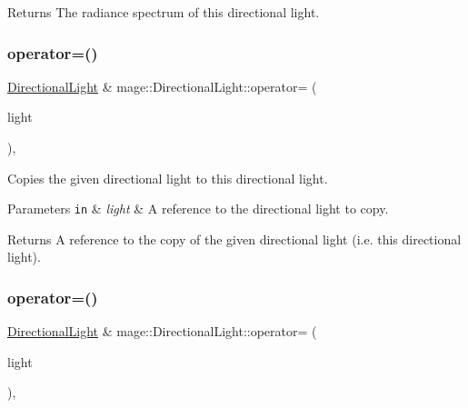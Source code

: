 \begin{DoxyReturn}{Returns}
The radiance spectrum of this directional light. 
\end{DoxyReturn}
\hypertarget{classmage_1_1_directional_light_acf66f214974d9fb60844c16e02c49b22}{}\label{classmage_1_1_directional_light_acf66f214974d9fb60844c16e02c49b22} 
\subsubsection{\texorpdfstring{operator=()}{operator=()}\hspace{0.1cm}{\footnotesize\ttfamily [1/2]}}
{\footnotesize\ttfamily \hyperlink{classmage_1_1_directional_light}{Directional\+Light} \& mage\+::\+Directional\+Light\+::operator= (\begin{DoxyParamCaption}\item[{const \hyperlink{classmage_1_1_directional_light}{Directional\+Light} \&}]{light }\end{DoxyParamCaption})\hspace{0.3cm}{\ttfamily [default]}, {\ttfamily [noexcept]}}

Copies the given directional light to this directional light.


\begin{DoxyParams}[1]{Parameters}
\mbox{\tt in}  & {\em light} & A reference to the directional light to copy. \\
\hline
\end{DoxyParams}
\begin{DoxyReturn}{Returns}
A reference to the copy of the given directional light (i.\+e. this directional light). 
\end{DoxyReturn}
\hypertarget{classmage_1_1_directional_light_a6affb7a9c6e9a509a2c80944d99b3506}{}\label{classmage_1_1_directional_light_a6affb7a9c6e9a509a2c80944d99b3506} 
\subsubsection{\texorpdfstring{operator=()}{operator=()}\hspace{0.1cm}{\footnotesize\ttfamily [2/2]}}
{\footnotesize\ttfamily \hyperlink{classmage_1_1_directional_light}{Directional\+Light} \& mage\+::\+Directional\+Light\+::operator= (\begin{DoxyParamCaption}\item[{\hyperlink{classmage_1_1_directional_light}{Directional\+Light} \&\&}]{light }\end{DoxyParamCaption})\hspace{0.3cm}{\ttfamily [default]}, {\ttfamily [noexcept]}}

